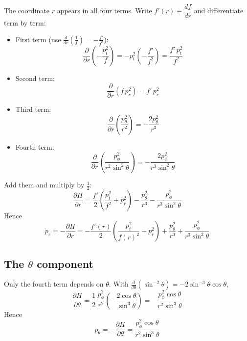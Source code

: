 \documentclass[11pt,a4paper]{article}
\begin{document}
The coordinate $r$ appears in all four terms. Write $f'(r) \equiv \dfrac{df}{dr}$ and differentiate term by term:
\begin{itemize}
  \item First term (use $\frac{d}{dr}\left(\frac{1}{f}\right) = -\frac{f'}{f^2}$):
  \begin{equation*}
  \frac{\partial}{\partial r}\left( -\frac{p_t^2}{f} \right) = -p_t^2 \left( -\frac{f'}{f^2} \right) = \frac{f'\, p_t^2}{f^2}
  \end{equation*}
  \item Second term:
  \begin{equation*}
  \frac{\partial}{\partial r}\left( f\, p_r^2 \right) = f'\, p_r^2
  \end{equation*}
  \item Third term:
  \begin{equation*}
  \frac{\partial}{\partial r}\left( \frac{p_\theta^2}{r^2} \right) = -\frac{2 p_\theta^2}{r^3}
  \end{equation*}
  \item Fourth term:
  \begin{equation*}
  \frac{\partial}{\partial r}\left( \frac{p_\phi^2}{r^2 \sin^2\theta} \right) = -\frac{2 p_\phi^2}{r^3 \sin^2\theta}
  \end{equation*}
\end{itemize}

Add them and multiply by $\tfrac{1}{2}$:
\begin{equation*}
\frac{\partial H}{\partial r} = \frac{f'}{2}\left( \frac{p_t^2}{f^2} + p_r^2 \right) - \frac{p_\theta^2}{r^3} - \frac{p_\phi^2}{r^3 \sin^2\theta}
\end{equation*}
Hence
\begin{equation*}
\dot{p}_r = -\frac{\partial H}{\partial r} = -\frac{f'(r)}{2}\left( \frac{p_t^2}{f(r)^2} + p_r^2 \right) + \frac{p_\theta^2}{r^3} + \frac{p_\phi^2}{r^3 \sin^2\theta} \tag{20c}\label{eq:20c}
\end{equation*}

\subsection{The \texorpdfstring{$\theta$}{theta} component}

Only the fourth term depends on $\theta$. With $\frac{d}{d\theta}\left(\sin^{-2}\theta\right) = -2\sin^{-3}\theta \cos\theta$,
\begin{equation*}
\frac{\partial H}{\partial \theta} = \frac{1}{2}\, \frac{p_\phi^2}{r^2} \left( -\frac{2\cos\theta}{\sin^3\theta} \right) = -\frac{p_\phi^2 \cos\theta}{r^2 \sin^3\theta}
\end{equation*}
Hence
\begin{equation*}
\dot{p}_\theta = -\frac{\partial H}{\partial \theta} = \frac{p_\phi^2 \cos\theta}{r^2 \sin^3\theta} \tag{20d}\label{eq:20d}
\end{equation*}
\end{document}
